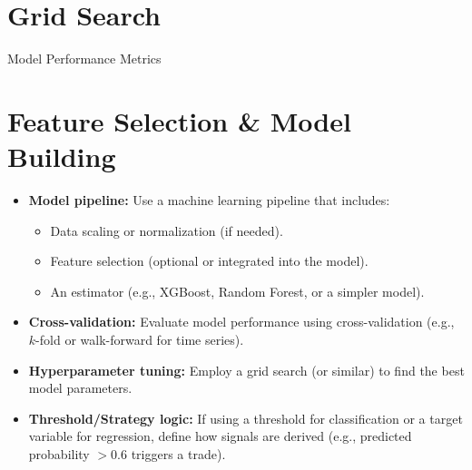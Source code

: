 \documentclass[11pt]{article}
\begin{document}
\section{Grid Search}
\begin{table}[h!]
    \centering
    \caption{Model Performance Metrics}
    \label{tab:model_metrics}
\end{table}


\section{Feature Selection \& Model Building}
\begin{itemize}
    \item \textbf{Model pipeline:} Use a machine learning pipeline that includes:
    \begin{itemize}
        \item Data scaling or normalization (if needed).
        \item Feature selection (optional or integrated into the model).
        \item An estimator (e.g., XGBoost, Random Forest, or a simpler model).
    \end{itemize}
    \item \textbf{Cross-validation:} Evaluate model performance using cross-validation (e.g., $k$-fold or walk-forward for time series).
    \item \textbf{Hyperparameter tuning:} Employ a grid search (or similar) to find the best model parameters.
    \item \textbf{Threshold/Strategy logic:} If using a threshold for classification or a target variable for regression, define how signals are derived (e.g., predicted probability $>0.6$ triggers a trade).
\end{itemize}
\end{document}

